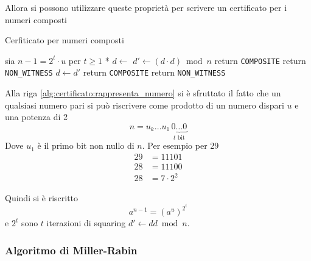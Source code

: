 Allora si possono utilizzare queste proprietà per scrivere un certificato per i numeri composti

\begin{algorithm}[H]
\caption{Cerfiticato per numeri composti}\label{alg:certificato}
\begin{algorithmic}[1]
        \State * sia $n-1 = 2^t \cdot u$ per $ t \geq 1$ *
        \label{alg:certificato:rappresenta_numero}
        \State $d \gets $
            \State $d' \gets
            \left( d \cdot d \right) \bmod n 
            $
                    \State return \texttt{COMPOSITE}
                \Else
                    \State return \texttt{NON\_WITNESS}
                \EndIf
            \EndIf
            \State $d \gets d'$
        \EndFor
            \State return \texttt{COMPOSITE}
        \Else
            \State return \texttt{NON\_WITNESS}
        \EndIf
    \EndProcedure
\end{algorithmic}
\end{algorithm}
Alla riga \ref{alg:certificato:rappresenta_numero} si è sfruttato il fatto che un qualsiasi numero pari si può riscrivere come prodotto di un numero dispari $u$ e una potenza di 2
\begin{equation*}
    n
    = 
    u_k \ldots u_1
    \,
    \underbrace{
        0 \ldots 0
    }_{
        \text{$t$ bit}
    }
\end{equation*}
Dove $u_1$ è il primo bit non nullo di $n$. Per esempio per 29
\begin{align*}
    29
    &= 
    11101
    \\
    28
    &= 
    11100
    \\
    28
    &= 
    7 \cdot 2^2
\end{align*}

Quindi si è riscritto 
\begin{equation*}
    a^{n-1}
    =
    \left( 
        a^{u}
    \right)^{2^t}
\end{equation*}
e $2^t$ sono $t$ iterazioni di squaring $d' \gets dd \bmod n $.

\subsubsection{Algoritmo di Miller-Rabin}

